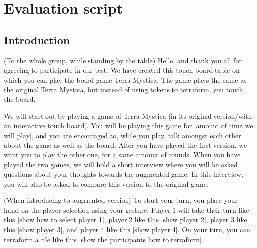 \chapter{Evaluation script}\label{ch:TestScript}
\section{Introduction}
(To the whole group, while standing by the table)
Hello, and thank you all for agreeing to participate in our test. We have created this touch board table on which you can play the board game Terra Mystica. The game plays the same as the original Terra Mystica, but instead of using tokens to terraform, you touch the board.

We will start out by playing a game of Terra Mystica (in its original version/with an interactive touch board). You will be playing this game for [amount of time we will play], and you are encouraged to, while you play, talk amongst each other about the game as well as the board. After you have played the first version, we want you to play the other one, for a same amount of rounds. When you have played the two games, we will hold a short interview where you will be asked questions about your thoughts towards the augmented game. In this interview, you will also be asked to compare this version to the original game.

(When introducing to augmented version)
To start your turn, you place your hand on the player selection using your gesture. Player 1 will take their turn like this [show how to select player 1], player 2 like this [show player 2], player 3 like this [show player 3], and player 4 like this [show player 4]. On your turn, you can terraform a tile like this [show the participants how to terraform].

